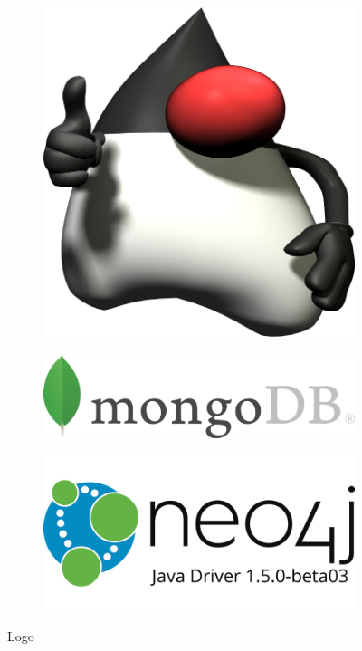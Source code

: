 \begin{figure}[H]
	\centering
	\begin{subfigure}[b]{0.2\textwidth}
		\centering
		\includegraphics[width=\textwidth]{assets/Duke3D}
		\caption{}
	\end{subfigure}
	\hfill
	\begin{subfigure}[b]{0.4\textwidth}
		\centering
		\includegraphics[width=\textwidth]{assets/mongoDB_logo.png}
		\caption{}
	\end{subfigure}
	\hfill
	\begin{subfigure}[b]{0.3\textwidth}
		\centering
		\includegraphics[width=\textwidth]{assets/logo_neo4j.png}
		\caption{}
	\end{subfigure}
	\caption{Logo}
	\label{fig:routingsdiff}
\end{figure}

